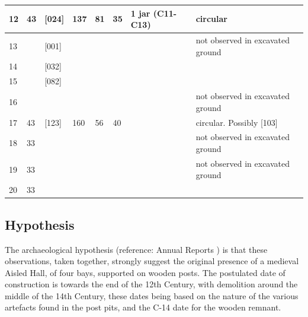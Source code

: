 \documentclass[letterpaper,11pt,titlepage]{article}
\begin{document}
{\begin{table}[]
\begin{tabular}{|p{1.25cm}|p{1.25cm}|p{1.25cm}|p{1cm}|p{1cm}|p{1.5cm}|p{4.5cm}|p{4cm}|}
12 & 43 & [024] & 137       & 81 & 35 & 1 jar (C11-C13)                                                                    & circular                         \\ \hline
13 &    & [001] &           &    &    &                                                                                    & not observed in excavated ground \\ \hline
14 &    & [032] &           &    &    &                                                                                    &                                  \\ \hline
15 &    & [082] &           &    &    &                                                                                    &                                  \\ \hline
16 &    &       &           &    &    &                                                                                    & not observed in excavated ground \\ \hline
17 & 43 & [123] & 160       & 56 & 40 &                                                                                    & circular. Possibly [103]         \\ \hline
18 & 33 &       &           &    &    &                                                                                    & not observed in excavated ground \\ \hline
19 & 33 &       &           &    &    &                                                                                    & not observed in excavated ground \\ \hline
20 & 33 &       &           &    &    &                                                                                    &                                  \\ \hline
		\bottomrule
	\end{tabular}
\end{table}

\subsection{Hypothesis}
The archaeological hypothesis (reference: Annual Reports ) is that these observations, taken together, strongly suggest the original presence of a medieval Aisled Hall, of four bays, supported on wooden posts. The postulated date of construction is towards the end of the 12th Century, with demolition around the middle of the 14th Century, these dates being based on the nature of the various artefacts found in the post pits, and the C-14 date for the wooden remnant.
}
\end{document}
